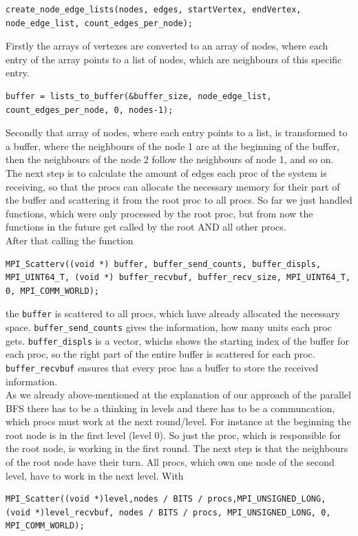 \documentclass[12pt,a4paper]{article}
\begin{document}
\begin{lstlisting}
create_node_edge_lists(nodes, edges, startVertex, endVertex, node_edge_list, count_edges_per_node);
\end{lstlisting}
Firstly the arrays of vertexes are converted to an array of nodes, where each entry of the array points to a list of nodes, which are neighbours of this specific entry.
\begin{lstlisting}
buffer = lists_to_buffer(&buffer_size, node_edge_list, count_edges_per_node, 0, nodes-1);
\end{lstlisting}
Secondly that array of nodes, where each entry points to a list, is transformed to a buffer, where the neighbours of the node 1 are at the beginning of the buffer, then the neighbours of the node 2 follow the neighbours of node 1, and so on.
The next step is to calculate the amount of edges each proc of the system is receiving, so that the procs can allocate the necessary memory for their part of the buffer and scattering it from the root proc to all procs.  So far we just handled functions, which were only processed by the root proc, but from now the functions in the future get called by the root AND all other procs. \\
After that calling the function
\begin{lstlisting}
MPI_Scatterv((void *) buffer, buffer_send_counts, buffer_displs, MPI_UINT64_T, (void *) buffer_recvbuf, buffer_recv_size, MPI_UINT64_T, 0, MPI_COMM_WORLD);
\end{lstlisting}
the \lstinline{buffer} is scattered to all procs, which have already allocated the necessary space. \lstinline{buffer_send_counts} gives the information, how many units each proc gets. \lstinline{buffer_displs} is a vector, whichs shows the starting index of the buffer for each proc, so the right part of the entire buffer is scattered for each proc. \lstinline{buffer_recvbuf} ensures that every proc has a buffer to store the received information.\\
As we already above-mentioned at the explanation of our approach of the parallel BFS there has to be a thinking in levels and there has to be a communcation, which procs must work at the next round/level. For instance at the beginning the root node is in the first level (level 0). So just the proc, which is responsible for the root node, is working in the first round. The next step is that the neighbours of the root node have their turn. All procs, which own one node of the second level, have to work in the next level. With
\begin{lstlisting}
MPI_Scatter((void *)level,nodes / BITS / procs,MPI_UNSIGNED_LONG, (void *)level_recvbuf, nodes / BITS / procs, MPI_UNSIGNED_LONG, 0, MPI_COMM_WORLD);
\end{lstlisting}
\end{document}
